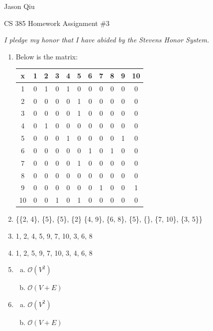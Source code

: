 \documentclass[a4paper,10pt]{article}
\begin{document}
Jason Qiu

CS 385 Homework Assignment $\#3$

\emph{I pledge my honor that I have abided by the Stevens Honor System.}
\begin{enumerate}
\item Below is the matrix:

\begin{tabular}{|c||c|c|c|c|c|c|c|c|c|c|}
	\hline
	x & 1 & 2 & 3 & 4 & 5 & 6 & 7 & 8 & 9 & 10\\
	\hline
	\hline
	1 & 0 & 1 & 0 & 1 & 0 & 0 & 0 & 0 & 0 & 0\\
	\hline
	2 & 0 & 0 & 0 & 0 & 1 & 0 & 0 & 0 & 0 & 0\\
	\hline
	3 & 0 & 0 & 0 & 0 & 1 & 0 & 0 & 0 & 0 & 0\\
	\hline
	4 & 0 & 1 & 0 & 0 & 0 & 0 & 0 & 0 & 0 & 0\\
	\hline
	5 & 0 & 0 & 0 & 1 & 0 & 0 & 0 & 0 & 1 & 0\\
	\hline
	6 & 0 & 0 & 0 & 0 & 0 & 1 & 0 & 1 & 0 & 0\\
	\hline
	7 & 0 & 0 & 0 & 0 & 1 & 0 & 0 & 0 & 0 & 0\\
	\hline
	8 & 0 & 0 & 0 & 0 & 0 & 0 & 0 & 0 & 0 & 0\\
	\hline
	9 & 0 & 0 & 0 & 0 & 0 & 0 & 1 & 0 & 0 & 1\\
	\hline
	10 & 0 & 0 & 1 & 0 & 1 & 0 & 0 & 0 & 0 & 0\\
	\hline
	\end{tabular}
\item \{\{2, 4\}, \{5\}, \{5\}, \{2\} \{4, 9\}, \{6, 8\}, \{5\}, \{\}, \{7, 10\}, \{3, 5\}\}

\item 1, 2, 4, 5, 9, 7, 10, 3, 6, 8

\item 1, 2, 5, 9, 7, 10, 3, 4, 6, 8

\item \begin{enumerate}[(a)]
	\item $\mathcal{O} (V^2)$

	\item $\mathcal{O} (V+E)$
\end{enumerate}

\item \begin{enumerate}[(a)]
	\item $\mathcal{O} (V^2)$

	\item $\mathcal{O} (V+E)$
\end{enumerate}



\end{enumerate}
\end{document}
